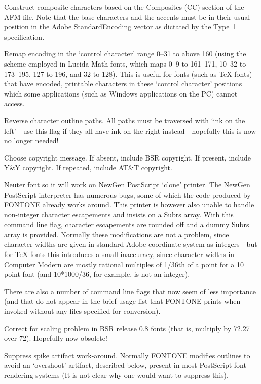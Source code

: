  Construct composite characters based on the 
Composites (CC) section of the AFM file.  Note that the base
characters and the accents must be in their usual position in the
Adobe StandardEncoding vector as dictated by the Type~1 specification.

 Remap encoding in the `control character' range 0--31 to
above 160
(using the scheme employed in Lucida Math fonts, which maps
0--9 to 161--171, 10--32 to 173--195, 127 to 196, and 32 to 128).
This is useful for fonts (such as {\TeX} fonts) that have encoded,
printable characters in these `control character' positions which some
applications (such as Windows applications on the PC) cannot access.

 Reverse character outline paths. All paths must be
traversed with `ink on the left'---use this flag if they all have ink
on the right instead---hopefully this is now no longer needed!

 Choose copyright message.  If absent, include BSR copyright.
If present, include Y\&Y copyright.
If repeated, include AT\&T copyright.

 Neuter font so it will work on NewGen PostScript `clone' printer.
The NewGen PostScript interpreter has numerous bugs, some of which
the code produced by FONTONE already works around. This printer is
however also unable to handle non-integer character escapements and
insists on a Subrs array.
With this command line flag, character escapements are rounded off and
a dummy Subrs array is provided.  Normally these modifications are
not a problem, since character widths are given in standard
Adobe coordinate system as integers---but for {\TeX} fonts this
introduces a small inaccuracy, since character widths in Computer
Modern are mostly rational multiples of 1/36th of a point for a 10
point font (and 10*1000/36, for example, is not an integer).

\endbullets

There are also a number of command line flags that now seem of less
importance (and that do not appear in the brief usage list that FONTONE
prints when invoked without any files specified for conversion).

\beginbullets

 Correct for scaling problem in BSR release 0.8 fonts
(that is, multiply by 72.27 over 72). Hopefully now obsolete!

 Suppress spike artifact work-around.  Normally FONTONE modifies
outlines to avoid an `overshoot' artifact, described below, present in
most PostScript font rendering systems 
(It is not clear why one would want to suppress this).

